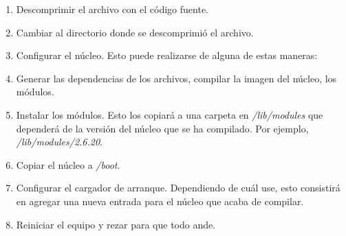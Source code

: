 \documentclass[12pt,a4paper,spanish]{article}
\begin{document}
\begin{enumerate}
\item Descomprimir el archivo con el código fuente.

\item Cambiar al directorio donde se descomprimió el archivo.

\item Configurar el núcleo. Esto puede realizarse de alguna de estas maneras:

\item Generar las dependencias de los archivos, compilar la imagen del núcleo, los módulos.

\item Instalar los módulos. Esto los copiará a una carpeta en \textit{/lib/modules} que dependerá de la versión del núcleo que se ha compilado. Por ejemplo, \textit{/lib/modules/2.6.20}.

\item Copiar el núcleo a \textit{/boot}. 

\item Configurar el cargador de arranque. Dependiendo de cuál use, esto consistirá en agregar una nueva entrada para el núcleo que acaba de compilar.

\item Reiniciar el equipo y rezar para que todo ande.

\end{enumerate} 
\end{document}
